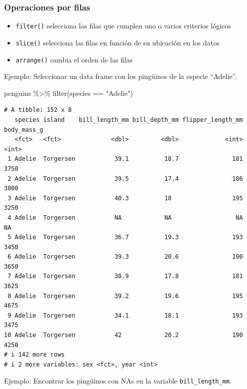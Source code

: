 \documentclass[
  letterpaper,
  DIV=11,
  numbers=noendperiod]{scrreprt}
\newenvironment{Shaded}{\begin{snugshade}}{\end{snugshade}}
\newcommand{\FunctionTok}[1]{\textcolor[rgb]{0.28,0.35,0.67}{#1}}
\newcommand{\NormalTok}[1]{\textcolor[rgb]{0.00,0.23,0.31}{#1}}
\newcommand{\SpecialCharTok}[1]{\textcolor[rgb]{0.37,0.37,0.37}{#1}}
\newcommand{\StringTok}[1]{\textcolor[rgb]{0.13,0.47,0.30}{#1}}
\begin{document}
\subsubsection{\texorpdfstring{\textbf{Operaciones por
filas}}{Operaciones por filas}}\label{operaciones-por-filas}

\begin{itemize}
\item
  \texttt{filter()} selecciona las filas que cumplen uno o varios
  criterios lógicos
\item
  \texttt{slice()} selecciona las filas en función de su ubicación en
  los datos
\item
  \texttt{arrange()} cambia el orden de las filas
\end{itemize}

{Ejemplo}: Seleccionar un data frame con los pingüinos de la especie
``Adelie''.

\begin{Shaded}
\begin{Highlighting}[]
\NormalTok{penguins }\SpecialCharTok{\%\textgreater{}\%} 
  \FunctionTok{filter}\NormalTok{(species }\SpecialCharTok{==} \StringTok{"Adelie"}\NormalTok{)}
\end{Highlighting}
\end{Shaded}

\begin{verbatim}
# A tibble: 152 x 8
   species island    bill_length_mm bill_depth_mm flipper_length_mm body_mass_g
   <fct>   <fct>              <dbl>         <dbl>             <int>       <int>
 1 Adelie  Torgersen           39.1          18.7               181        3750
 2 Adelie  Torgersen           39.5          17.4               186        3800
 3 Adelie  Torgersen           40.3          18                 195        3250
 4 Adelie  Torgersen           NA            NA                  NA          NA
 5 Adelie  Torgersen           36.7          19.3               193        3450
 6 Adelie  Torgersen           39.3          20.6               190        3650
 7 Adelie  Torgersen           38.9          17.8               181        3625
 8 Adelie  Torgersen           39.2          19.6               195        4675
 9 Adelie  Torgersen           34.1          18.1               193        3475
10 Adelie  Torgersen           42            20.2               190        4250
# i 142 more rows
# i 2 more variables: sex <fct>, year <int>
\end{verbatim}

{Ejemplo}: Encontrar los pingüinos con NAs en la variable
\texttt{bill\_length\_mm}.
\end{document}
